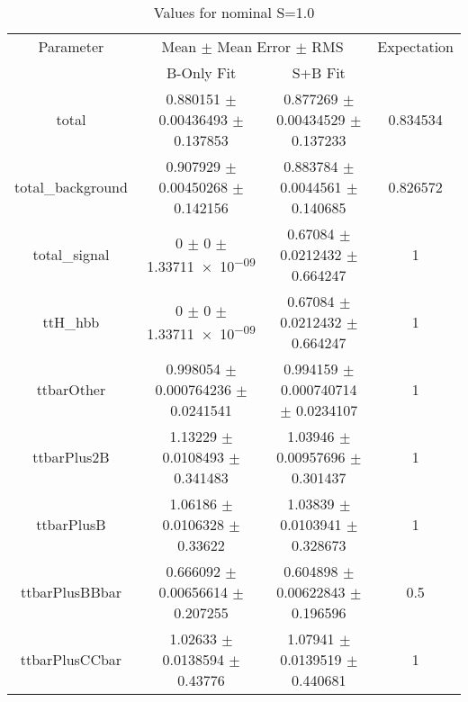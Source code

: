 \begin{table}
\centering
\caption{Values for nominal S=1.0}
\begin{tabular}{cccc}
\toprule
Parameter & \multicolumn{2}{c}{Mean $\pm$ Mean Error $\pm$ RMS} & Expectation\\
 & B-Only Fit & S+B Fit & \\
\midrule
total & \num{0.880151} $\pm$ \num{0.00436493} $\pm$ \num{0.137853} & \num{0.877269} $\pm$ \num{0.00434529} $\pm$ \num{0.137233} & \num{0.834534}\\
total\_background & \num{0.907929} $\pm$ \num{0.00450268} $\pm$ \num{0.142156} & \num{0.883784} $\pm$ \num{0.0044561} $\pm$ \num{0.140685} & \num{0.826572}\\
total\_signal & \num{0} $\pm$ \num{0} $\pm$ \num{1.33711e-09} & \num{0.67084} $\pm$ \num{0.0212432} $\pm$ \num{0.664247} & \num{1}\\
ttH\_hbb & \num{0} $\pm$ \num{0} $\pm$ \num{1.33711e-09} & \num{0.67084} $\pm$ \num{0.0212432} $\pm$ \num{0.664247} & \num{1}\\
ttbarOther & \num{0.998054} $\pm$ \num{0.000764236} $\pm$ \num{0.0241541} & \num{0.994159} $\pm$ \num{0.000740714} $\pm$ \num{0.0234107} & \num{1}\\
ttbarPlus2B & \num{1.13229} $\pm$ \num{0.0108493} $\pm$ \num{0.341483} & \num{1.03946} $\pm$ \num{0.00957696} $\pm$ \num{0.301437} & \num{1}\\
ttbarPlusB & \num{1.06186} $\pm$ \num{0.0106328} $\pm$ \num{0.33622} & \num{1.03839} $\pm$ \num{0.0103941} $\pm$ \num{0.328673} & \num{1}\\
ttbarPlusBBbar & \num{0.666092} $\pm$ \num{0.00656614} $\pm$ \num{0.207255} & \num{0.604898} $\pm$ \num{0.00622843} $\pm$ \num{0.196596} & \num{0.5}\\
ttbarPlusCCbar & \num{1.02633} $\pm$ \num{0.0138594} $\pm$ \num{0.43776} & \num{1.07941} $\pm$ \num{0.0139519} $\pm$ \num{0.440681} & \num{1}\\
\bottomrule
\end{tabular}
\end{table}